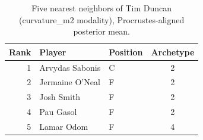 \begin{table}[htbp]
  \centering\small
  \begin{tabular}{rllc}
    \toprule
    Rank & Player & Position & Archetype \\
    \midrule
    1 & Arvydas Sabonis & C & 2 \\
    2 & Jermaine O'Neal & F & 2 \\
    3 & Josh Smith & F & 2 \\
    4 & Pau Gasol & F & 2 \\
    5 & Lamar Odom & F & 4 \\
    \bottomrule
  \end{tabular}
  \caption{Five nearest neighbors of Tim Duncan (curvature_m2 modality), Procrustes-aligned posterior mean.}
  \label{tab:Tim_Duncan_neighbors_curvature_m2}
\end{table}


